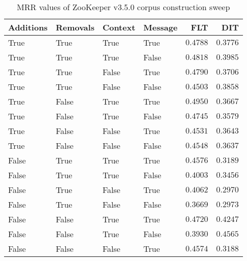 
\begin{table}
\begin{spacing}{1.2}
\centering
\caption{MRR values of ZooKeeper v3.5.0 corpus construction sweep}
\label{table:zookeeper_corpus_sweep}
\vspace{0.2em}
\begin{tabular}{llll|rr}
\toprule
Additions & Removals & Context & Message & FLT &        DIT \\
\midrule
     True &     True &    True &    True &         $0.4788$ &      $0.3776$ \\
     True &     True &    True &   False &         $0.4818$ &      $0.3985$ \\
     True &     True &   False &    True &         $0.4790$ &      $0.3706$ \\
     True &     True &   False &   False &         $0.4503$ &      $0.3858$ \\
     True &    False &    True &    True &    $\bm{0.4950}$ &      $0.3667$ \\
     True &    False &    True &   False &         $0.4745$ &      $0.3579$ \\
     True &    False &   False &    True &         $0.4531$ &      $0.3643$ \\
     True &    False &   False &   False &         $0.4548$ &      $0.3637$ \\
    False &     True &    True &    True &         $0.4576$ &      $0.3189$ \\
    False &     True &    True &   False &         $0.4003$ &      $0.3456$ \\
    False &     True &   False &    True &         $0.4062$ &      $0.2970$ \\
    False &     True &   False &   False &         $0.3669$ &      $0.2973$ \\
    False &    False &    True &    True &         $0.4720$ &      $0.4247$ \\
    False &    False &    True &   False &         $0.3930$ & $\bm{0.4565}$ \\
    False &    False &   False &    True &         $0.4574$ &      $0.3188$ \\
\bottomrule
\end{tabular}

\end{spacing}
\end{table}
